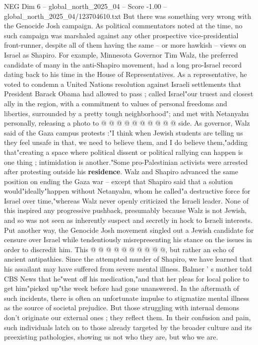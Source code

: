 \begin{textsample}{NEG Dim 6 – global\_north\_2025\_04 – Score -1.00 – global\_north\_2025\_04/123704610.txt}
But there was something very wrong with the Genocide Josh campaign.
As political commentators noted at the time, no such campaign was marshaled against any other prospective vice-presidential front-runner, despite all of them having the same -- or more hawkish -- views on Israel as Shapiro.
For example, Minnesota Governor Tim Walz, the preferred candidate of many in the anti-Shapiro movement, had a long pro-Israel record dating back to his time in the House of Representatives.
As a representative, he voted to condemn a United Nations resolution against Israeli settlements that President Barack Obama had allowed to pass ; called Israel"our truest and closest ally in the region, with a commitment to values of personal freedoms and liberties, surrounded by a pretty tough neighborhood"; and met with Netanyahu personally, releasing a photo to @ @ @ @ @ @ @ @ @ @ side.
As governor, Walz said of the Gaza campus protests :"I think when Jewish students are telling us they feel unsafe in that, we need to believe them, and I do believe them,"adding that"creating a space where political dissent or political rallying can happen is one thing ; intimidation is another."Some pro-Palestinian activists were arrested after protesting outside his \textbf{residence}.
Walz and Shapiro advanced the same position on ending the Gaza war -- except that Shapiro said that a solution would"ideally"happen without Netanyahu, whom he called"a destructive force for Israel over time,"whereas Walz never openly criticized the Israeli leader.
None of this inspired any progressive pushback, presumably because Walz is not Jewish, and so was not seen as inherently suspect and secretly in hock to Israeli interests.
Put another way, the Genocide Josh movement singled out a Jewish candidate for censure over Israel while tendentiously misrepresenting his stance on the issues in order to discredit him.
This @ @ @ @ @ @ @ @ @ @, but rather an echo of ancient antipathies.
Since the attempted murder of Shapiro, we have learned that his assailant may have suffered from severe mental illness.
Balmer ' s mother told CBS News that he"went off his medication,"and that her pleas for local police to get him"picked up"the week before had gone unanswered.
In the aftermath of such incidents, there is often an unfortunate impulse to stigmatize mental illness as the source of societal prejudice.
But those struggling with internal demons don't originate our external ones ; they reflect them.
In their confusion and pain, such individuals latch on to those already targeted by the broader culture and its preexisting pathologies, showing us not who they are, but who we are.

\end{textsample}

